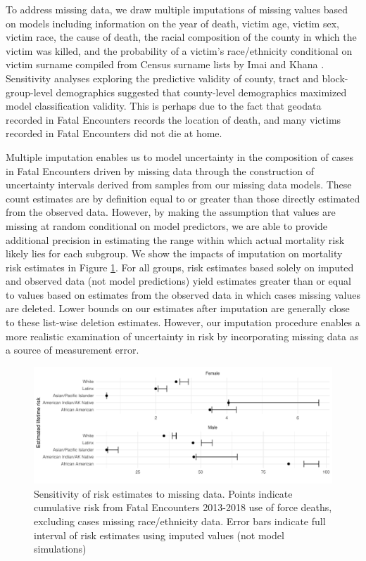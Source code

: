 \documentclass{article}
\begin{document}


To address missing data, we draw multiple imputations of missing values based on models including information on the year of death, victim age, victim sex, victim race, the cause of death, the racial composition of the county in which the victim was killed, and the probability of a victim's race/ethnicity conditional on victim surname compiled from Census surname lists by Imai and Khana \cite{imai2016improving}. Sensitivity analyses exploring the predictive validity of county, tract and block-group-level demographics suggested that county-level demographics maximized model classification validity. This is perhaps due to the fact that geodata recorded in Fatal Encounters records the location of death, and many victims recorded in Fatal Encounters did not die at home. 

Multiple imputation enables us to model uncertainty in the composition of cases in Fatal Encounters driven by missing data through the construction of uncertainty intervals derived from samples from our missing data models. These count estimates are by definition equal to or greater than those directly estimated from the observed data. However, by making the assumption that values are missing at random conditional on model predictors, we are able to provide additional precision in estimating the range within which actual mortality risk likely lies for each subgroup. We show the impacts of imputation on mortality risk estimates in Figure \ref{fig:na_rm}. For all groups, risk estimates based solely on imputed and observed data (not model predictions) yield estimates greater than or equal to values based on estimates from the observed data in which cases missing values are deleted. Lower bounds on our estimates after imputation are generally close to these list-wise deletion estimates. However, our imputation procedure enables a more realistic examination of uncertainty in risk by incorporating missing data as a source of measurement error.

\begin{figure}
	\includegraphics[width=\linewidth]{vis/imp_period_sensitivity.pdf}
	\caption{Sensitivity of risk estimates to missing data. Points indicate cumulative risk from Fatal Encounters 2013-2018 use of force deaths, excluding cases missing race/ethnicity data. Error bars indicate full interval of risk estimates using imputed values (not model simulations)}
	\label{fig:na_rm}
\end{figure}
\end{document}
